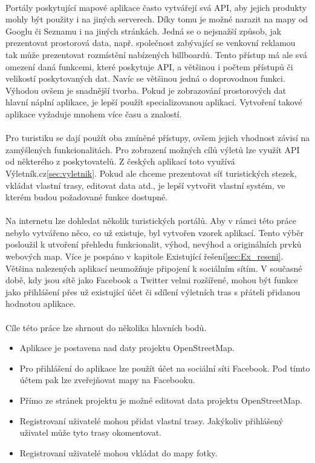 \documentclass[11pt,a4paper,titlepage,oneside]{book}
\begin{document}
	\paragraph{} Portály poskytující mapové aplikace často vytvářejí svá API, aby jejich produkty mohly být použity i na jiných serverech. Díky tomu je možné narazit na mapy od Googlu či Seznamu i na jiných stránkách. Jedná se o nejsnažší způsob, jak prezentovat prostorová data, např. společnost zabývající se venkovní reklamou tak může prezentovat rozmístění nabízených billboardů. Tento přístup má ale svá omezení daná funkcemi, které poskytuje API, a většinou i počtem přístupů či velikostí poskytovaných dat. Navíc se většinou jedná o doprovodnou funkci. Výhodou ovšem je snadnější tvorba. Pokud je zobrazování prostorových dat hlavní náplní aplikace, je lepší použít specializovanou aplikaci. Vytvoření takové aplikace vyžaduje mnohem více času a znalostí. 
	\paragraph{} Pro turistiku se dají použít oba zmíněné přístupy, ovšem jejich vhodnost závisí na zamýšlených funkcionalitách. Pro zobrazení možných cílů výletů lze využít API od některého z poskytovatelů. Z českých aplikací toto využívá Výletník.cz\ref{sec:vyletnik}. Pokud ale chceme prezentovat síť turistických stezek, vkládat vlastní trasy, editovat data atd., je lepší vytvořit vlastní systém, ve kterém budou požadované funkce dostupné.
	\paragraph{} Na internetu lze dohledat několik turistických portálů. Aby v rámci této práce nebylo vytvářeno něco, co už existuje, byl vytvořen vzorek aplikací. Tento výběr posloužil k utvoření přehledu funkcionalit, výhod, nevýhod a originálních prvků webových map. Více je pospáno v kapitole Existující řešení\ref{sec:Ex_reseni}. Většina nalezených aplikací neumožňuje připojení k sociálním sítím. V současné době, kdy jsou sítě jako Facebook a Twitter velmi rozšířené, mohou být funkce jako přihlášení přes už existující účet či sdílení výletních tras s přáteli přidanou hodnotou aplikace. 
	\paragraph{} Cíle této práce lze shrnout do několika hlavních bodů.
		\begin{itemize}
			\item Aplikace je postavena nad daty projektu OpenStreetMap.
			\item Pro přihlášení do aplikace lze použít účet na sociální síti Facebook. Pod tímto účtem pak lze zveřejňovat mapy na Facebooku.
			\item Přímo ze stránek projektu je možné editovat data projektu OpenStreetMap.
			\item Registrovaní uživatelé mohou přidat vlastní trasy. Jakýkoliv přihlášený uživatel může tyto trasy okomentovat.
			\item Registrovaní uživatelé mohou vkládat do mapy fotky.
		\end{itemize}
\end{document}
